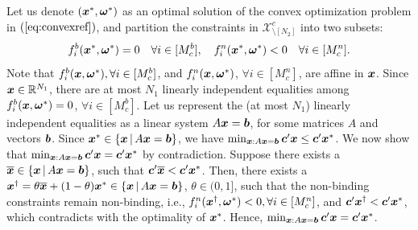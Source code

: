 \documentclass[fleqn,mnsc,blindrev]{informs4}
\newcommand{\mb}[1]{\mbox{\boldmath \ensuremath{#1}}}
\begin{document}
\begin{appendices}
{    Let us denote $(\mb{x}^*,\mb{\omega}^*)$ as an optimal solution of the convex optimization problem in $(\ref{eq:convexref})$, and partition the constraints in $\mathcal{X}^{c}_{\setminus [N_2]}$ into two subsets: 
\begin{equation*}
	f_i^b(\mb{x}^*,\mb{\omega}^*) = 0  \quad \forall i\in [M^b_c], \quad f_i^n(\mb{x}^*,\mb{\omega}^*) <0  \quad \forall i\in [M^n_c].
\end{equation*}
	Note that $f_i^b(\mb{x},\mb{\omega}^*), \forall i\in [M^b_c]$, and $f_i^n(\mb{x},\mb{\omega}^*)$,  $\forall i\in [M^n_c]$,  are affine in $\mb{x}$. Since $\mb{x} \in \mathbb{R}^{N_1}$, there are at most $N_1$ linearly independent equalities among $f_i^b(\mb{x},\mb{\omega}^*) = 0$, $\forall i\in [M^b_c]$.  Let us represent the (at most $N_1$) linearly independent equalities as a linear system $A\mb{x} = \mb{b}$, for some matrices $A$ and vectors $\mb{b}$. Since $\mb{x}^* \in \left\{ \mb{x} \,| \, A\mb{x} = \mb{b} \right\}$,  we have $\min_{\boldsymbol{x} : A\boldsymbol{x} = \boldsymbol{b} } \mb{c}'\mb{x} \le \mb{c}'\mb{x}^*$. We now show that $\min_{\boldsymbol{x} : A\boldsymbol{x} = \boldsymbol{b} } \mb{c}'\mb{x} = \mb{c}'\mb{x}^*$ by contradiction.	Suppose there exists a $\overline{\mb{x}} \in \left\{ \mb{x} \,| \, A\mb{x} = \mb{b} \right\}$, such that $\mb{c}'\overline{\mb{x}} < \mb{c}'\mb{x}^*$. Then, there exists a $\mb{x}^{\dagger} = \theta \overline{\mb{x}} +(1- \theta)\mb{x}^* \in \left\{ \mb{x} \,| \, A\mb{x} = \mb{b} \right\}$, $\theta\in (0,1]$, such that the non-binding constraints remain non-binding, i.e., $f_i^n(\mb{x}^{\dagger},\mb{\omega}^*) <0 , \forall i\in [M^n_c]$, and $ \mb{c}'\mb{x}^{\dagger} < \mb{c}'\mb{x}^*$, which contradicts with the optimality of $\mb{x}^*$.  Hence, $\min_{\boldsymbol{x} : A\boldsymbol{x} = \boldsymbol{b} } \mb{c}'\mb{x} = \mb{c}'\mb{x}^*$. 
	
}
\end{appendices}
\end{document}
